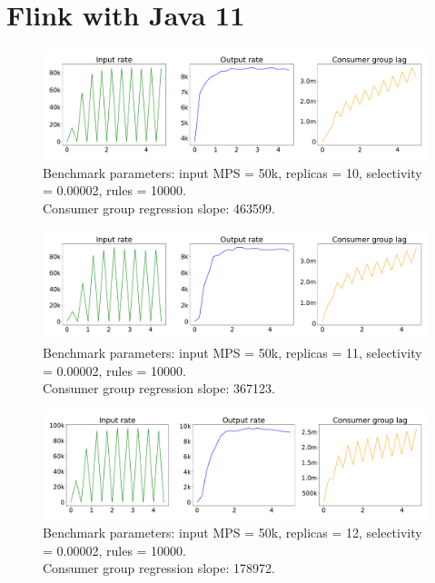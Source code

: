 \newpage

\section{Flink with Java 11}\label{sec:flink-on-java-11}

\begin{figure}[H]
    \centering
    \includegraphics[width=1\textwidth]{figures/flink-java-11-replicas-10}
    \caption{Benchmark parameters: input MPS = 50k, replicas = 10, selectivity = 0.00002, rules = 10000. \\
    Consumer group regression slope: 463599.}
    \label{fig:flink-java-11-replicas-10}
\end{figure}


\begin{figure}[H]
    \centering
    \includegraphics[width=1\textwidth]{figures/flink-java-11-replicas-11}
    \caption{Benchmark parameters: input MPS = 50k, replicas = 11, selectivity = 0.00002, rules = 10000. \\
    Consumer group regression slope: 367123.}
    \label{fig:flink-java-11-replicas-11}
\end{figure}

\begin{figure}[H]
    \centering
    \includegraphics[width=1\textwidth]{figures/flink-java-11-replicas-12}
    \caption{Benchmark parameters: input MPS = 50k, replicas = 12, selectivity = 0.00002, rules = 10000. \\
    Consumer group regression slope: 178972.}
    \label{fig:flink-java-11-replicas-12}
\end{figure}


